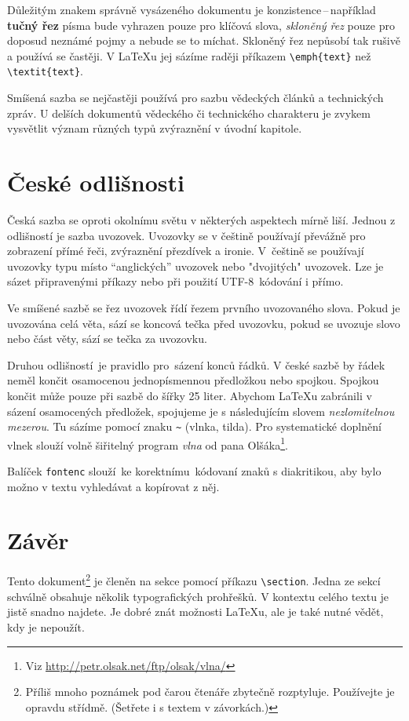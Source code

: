 \documentclass[a4paper, 10pt, twocolumn]{article}
\begin{document}
        Důležitým znakem správně vysázeného dokumentu je konzistence\,--\,například \textbf{tučný řez} písma bude vyhrazen pouze pro klíčová slova, \emph{skloněný řez} pouze pro doposud neznámé pojmy a nebude se to míchat. \mbox{Skloněný} řez nepůsobí tak rušivě a používá se častěji. V {\LaTeX}u jej sázíme raději příkazem \verb!\emph{text}! než \verb!\textit{text}!.

        Smíšená sazba se nejčastěji používá pro sazbu vědec\-kých článků a technických zpráv. U delších dokumentů vědeckého či technického charakteru je zvykem vysvětlit význam různých typů zvýraznění v úvodní kapitole.
    
    \section{České odlišnosti}
    
        Česká sazba se oproti okolnímu světu v některých aspektech mírně liší. Jednou z odlišností je sazba uvozovek. Uvozovky se v češtině používají převážně pro zobrazení přímé řeči, zvýraznění přezdívek a ironie. V~češtině se používají uvozovky typu  místo ``anglických'' uvozovek nebo "dvojitých" uvozovek. Lze je sázet připravenými příkazy nebo při použití UTF-8~kó\-dování i přímo.

        Ve smíšené sazbě se řez uvozovek řídí řezem prvního uvozovaného slova. Pokud je uvozována celá věta, sází se koncová tečka před uvozovku, pokud se uvozuje slovo nebo část věty, sází se tečka za uvozovku.

        Druhou odlišností \,je pravidlo pro\, sázení konců řádků.
        V české sazbě by řádek neměl končit osamocenou jednopísmennou předložkou nebo spojkou. Spojkou  končit může pouze při sazbě do šířky 25 liter. Abychom {\LaTeX}u zabránili v sázení osamocených předložek, spojujeme je s následujícím slovem \emph{nezlomitelnou mezerou}. Tu sázíme pomocí znaku \verb!~! (vlnka, tilda). Pro systematické doplnění vlnek slouží volně šiřitelný program \emph{vlna} od pana Olšáka\footnote{Viz \url{http://petr.olsak.net/ftp/olsak/vlna/}}.

        Balíček \verb!fontenc! slouží\, ke korektnímu \,kódovaní znaků s diakritikou, aby bylo možno v textu vyhledávat a kopírovat z něj.
    
    \section{Závěr}

        Tento dokument\footnote{Příliš mnoho poznámek pod čarou čtenáře zbytečně rozptyluje. Používejte je opravdu střídmě. (Šetřete i s textem v závorkách.)} je členěn na sekce pomocí příkazu \verb!\section!. Jedna ze sekcí schválně obsahuje několik typografických prohřešků. V kontextu celého textu je jistě snadno najdete. Je dobré znát možnosti {\LaTeX}u, ale je také nutné vědět, kdy je nepoužít.
\end{document}
